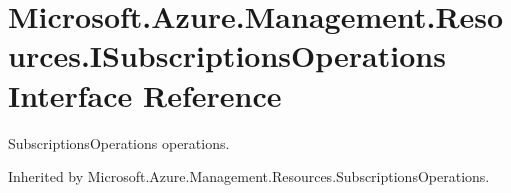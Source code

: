 \hypertarget{interface_microsoft_1_1_azure_1_1_management_1_1_resources_1_1_i_subscriptions_operations}{}\section{Microsoft.\+Azure.\+Management.\+Resources.\+I\+Subscriptions\+Operations Interface Reference}
\label{interface_microsoft_1_1_azure_1_1_management_1_1_resources_1_1_i_subscriptions_operations}


Subscriptions\+Operations operations.  




Inherited by Microsoft.\+Azure.\+Management.\+Resources.\+Subscriptions\+Operations.

